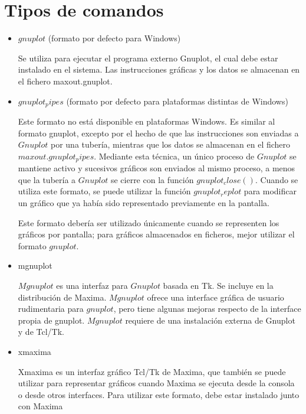 \documentclass[10pt,a4paper]{book}
\begin{document}
\section{Tipos de comandos}
\begin{small}

\begin{itemize}
\item $gnuplot$ (formato por defecto para Windows)

Se utiliza para ejecutar el programa externo Gnuplot, el cual debe estar instalado en el sistema. Las instrucciones gráficas y los datos se almacenan en el fichero maxout.gnuplot.

\item $gnuplot_pipes$ (formato por defecto para plataformas distintas de Windows)

Este formato no está disponible en plataformas Windows. Es similar al formato gnuplot, excepto por el hecho de que las instrucciones son enviadas a $Gnuplot$ por una tubería, mientras que los datos se almacenan en el fichero $maxout.gnuplot_pipes$. 
Mediante esta técnica, un único proceso de $Gnuplot$ se mantiene activo y sucesivos gráficos son enviados al mismo proceso, a menos que la tubería a $Gnuplot$ se cierre con la función $gnuplot_close()$. Cuando se utiliza este formato, se puede utilizar la función $gnuplot_replot$ para modificar un gráfico que ya había sido representado previamente en la pantalla.

Este formato debería ser utilizado únicamente cuando se representen los gráficos por pantalla; para gráficos almacenados en ficheros, mejor utilizar el formato $gnuplot$.

\item mgnuplot

$Mgnuplot$ es una interfaz para $Gnuplot$ basada en Tk. Se incluye en la distribución de Maxima. $Mgnuplot$ ofrece una interface gráfica de usuario rudimentaria para $gnuplot$, pero tiene algunas mejoras respecto de la interface propia de gnuplot. $Mgnuplot$ requiere de una instalación externa de Gnuplot y de Tcl/Tk.

\item xmaxima

Xmaxima es un interfaz gráfico Tcl/Tk de Maxima, que también se puede utilizar para representar gráficos cuando Maxima se ejecuta desde la consola o desde otros interfaces. Para utilizar este formato, debe estar instalado junto con Maxima
\end{itemize}


\end{small}
\end{document}
